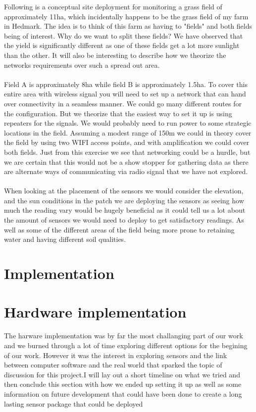 \documentclass[]{uiophd}
\begin{document}
 Following is a conceptual site deployment for monitoring a grass field of approximately 11ha, which incidentally happens to be the grass field of my farm in Hedmark. The idea is to think of this farm as having to "fields" and both fields being of interest. Why do we want to split these fields? We have observed that the yield is significantly different as one of these fields get a lot more sunlight than the other. It will also be interesting to describe how we theorize the networks requirements over such a spread out area.
 \\\\
 Field A is approximately 8ha while field B is approximately 1.5ha. To cover this entire area with wireless signal you will need to set up a network that can hand over connectivity in a seamless manner. We could go many different routes for the configuration. But we theorize that the easiest way to set it up is using repeaters for the signals. We would probably need to run power to some strategic locations in the field. Assuming a modest range of 150m we could in theory cover the field by using two WIFI access points, and with amplification we could cover both fields. Just from this exercise we see that networking could be a hurdle, but we are certain that this would not be a show stopper for gathering data as there are alternate ways of communicating via radio signal that we have not explored.
 \\\\
 When looking at the placement of the sensors we would consider the elevation, and the sun conditions in the patch we are deploying the sensors as seeing how much the reading vary would be hugely beneficial as it could tell us a lot about the amount of sensors we would need to deploy to get satisfactory readings. As well as some of the different areas of the field being more prone to retaining water and having different soil qualities. 
  
\section{Implementation}
\section{Hardware implementation}
The harware implementation was by far the most challanging part of our work and we burned through a lot of time exploring different options for the begining of our work. However it was the interest in exploring sensors and the link between computer software and the real world that sparked the topic of discussion for this project.I will lay out a short timeline on what we tried and then conclude this section with how we ended up setting it up as well as some information on future development that could have been done to create a long lasting sensor package that could be deployed 
\end{document}
